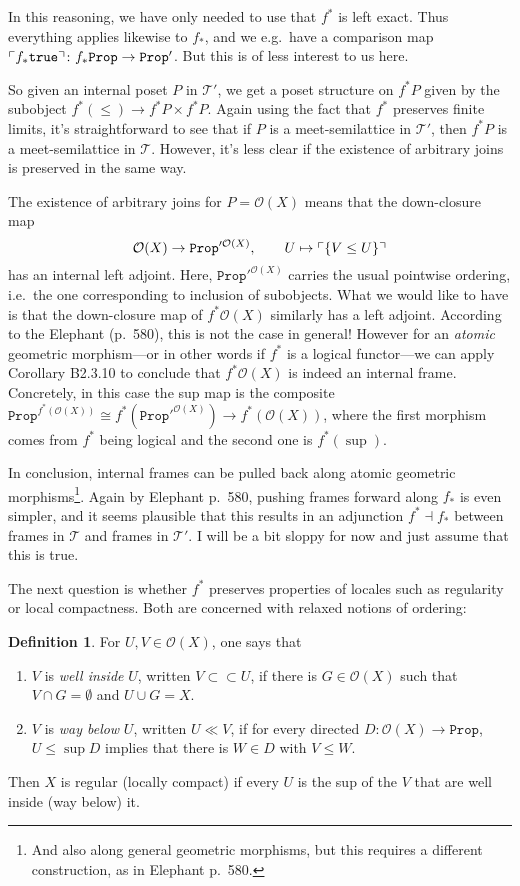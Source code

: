 \documentclass[11pt, oneside, article]{memoir}
\theoremstyle{plain}
\theoremstyle{definition}
\newtheorem{definition}[theorem]{Definition}
\theoremstyle{remark}
\DeclarePairedDelimiter{\classify}{\ulcorner}{\urcorner}
\newcommand{\const}[1]{\mathtt{#1}}
\newcommand{\Prop}{\const{Prop}}
\begin{document}
In this reasoning, we have only needed to use that $f^*$ is left exact. Thus everything applies likewise to $f_*$, and we e.g.~have a comparison map $\classify{f_*\const{true}}\colon f_*\Prop\to\Prop'$. But this is of less interest to us here.

So given an internal poset $P$ in $\mathcal{T}'$, we get a poset structure on $f^*P$ given by the subobject $f^*(\leq) \to f^*P\times f^*P$. Again using the fact that $f^*$ preserves finite limits, it's straightforward to see that if $P$ is a meet-semilattice in $\mathcal{T}'$, then $f^*P$ is a meet-semilattice in $\mathcal{T}$. However, it's less clear if the existence of arbitrary joins is preserved in the same way.

The existence of arbitrary joins for $P = \mathcal{O}(X)$ means that the down-closure map
\[
	\mathcal{O}(X)\to\Prop'^{\mathcal{O}(X)},\qquad U\mapsto \classify{ \{ V \leq U \} }
\]
has an internal left adjoint. Here, $\Prop'^{\mathcal{O}(X)}$ carries the usual pointwise ordering, i.e.~the one corresponding to inclusion of subobjects. What we would like to have is that the down-closure map of $f^*\mathcal{O}(X)$ similarly has a left adjoint. According to the Elephant (p.~580), this is not the case in general! However for an \emph{atomic} geometric morphism---or in other words if $f^*$ is a logical functor---we can apply Corollary B2.3.10 to conclude that $f^*\mathcal{O}(X)$ is indeed an internal frame. Concretely, in this case the sup map is the composite $\Prop^{f^*(\mathcal{O}(X))}\cong f^*\left(\Prop'^{\mathcal{O}(X)}\right)\to f^*(\mathcal{O}(X))$, where the first morphism comes from $f^*$ being logical and the second one is $f^*(\sup)$.

In conclusion, internal frames can be pulled back along atomic geometric morphisms\footnote{And also along general geometric morphisms, but this requires a different construction, as in Elephant p.~580.}. Again by Elephant p.~580, pushing frames forward along $f_*$ is even simpler, and it seems plausible that this results in an adjunction $f^* \dashv f_*$ between frames in $\mathcal{T}$ and frames in $\mathcal{T}'$. I will be a bit sloppy for now and just assume that this is true.

The next question is whether $f^*$ preserves properties of locales such as regularity or local compactness. Both are concerned with relaxed notions of ordering:

\begin{definition}
For $U,V\in\mathcal{O}(X)$, one says that
\begin{enumerate}
\item $V$ is \emph{well inside} $U$, written $V\subset\subset U$, if there is $G\in\mathcal{O}(X)$ such that $V\cap G = \emptyset$ and $U\cup G = X$.
\item $V$ is \emph{way below} $U$, written $U\ll V$, if for every directed $D:\mathcal{O}(X)\to\Prop$, $U\leq\sup D$ implies that there is $W\in D$ with $V\leq W$.
\end{enumerate}
Then $X$ is regular (locally compact) if every $U$ is the sup of the $V$ that are well inside (way below) it.
\end{definition}
\end{document}
